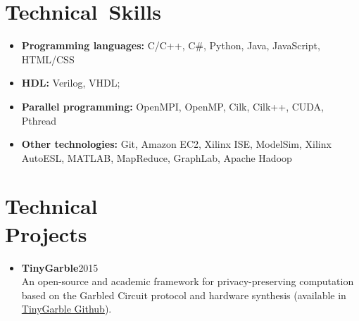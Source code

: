 \documentclass[overlapped]{res}
\begin{document}
\begin{resume}
\section{Technical\ Skills}
\begin{itemize}
\item {\bf Programming languages:} C/C++, C\#, Python, Java, JavaScript, HTML/CSS
\item {\bf HDL:} Verilog, VHDL;
\item {\bf Parallel programming:} OpenMPI, OpenMP, Cilk, Cilk++, CUDA, Pthread
\item {\bf Other technologies:} Git, Amazon EC2, Xilinx ISE, ModelSim, Xilinx AutoESL, MATLAB, MapReduce, GraphLab, Apache Hadoop
\end{itemize}

\section{Technical\\ Projects}
\begin{itemize}
\item {\bf TinyGarble}\hfill 2015\\
An open-source and academic framework for privacy-preserving computation based on the Garbled Circuit protocol and hardware synthesis (available in \href{https://github.com/esonghori/TinyGarble}{TinyGarble Github}).
\end{itemize}


\end{resume}
\end{document}
